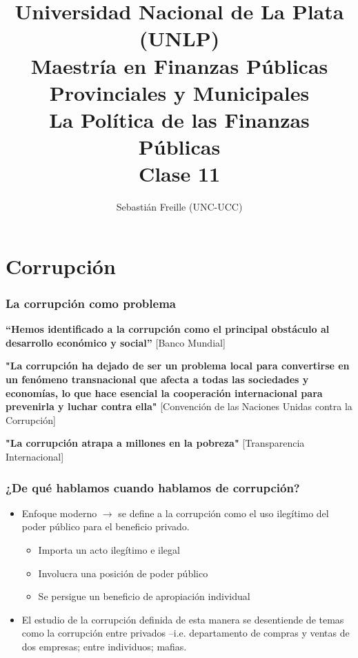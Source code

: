 \documentclass[handout,final,xcolor=dvipsnames]{beamer}
\author{Sebastián Freille (UNC-UCC)}
\title{Universidad Nacional de La Plata (UNLP) \\
  Maestría en Finanzas Públicas Provinciales y Municipales \\ La
  Política de las Finanzas Públicas \\ Clase 11}
\date{}
\institute{}
\begin{document}
\maketitle



\section{Corrupción}



\begin{frame}\frametitle{La corrupción como problema}
\begin{list}{}
\item \textbf{``Hemos identificado a la corrupción como el principal obstáculo al
desarrollo económico y social''} [Banco Mundial] \bigskip
\item \textbf{"La corrupción ha dejado de ser un problema local para convertirse en
un fenómeno transnacional que afecta a todas las sociedades y
economías, lo que hace esencial la cooperación internacional para
prevenirla y luchar contra ella"} [Convención de las Naciones Unidas
contra la Corrupción] \bigskip 
\item \textbf{"La corrupción atrapa a millones en la pobreza"} [Transparencia
  Internacional] \bigskip 
\end{list}
\end{frame}


\begin{frame}\frametitle{¿De qué hablamos cuando hablamos de corrupción?}
\begin{itemize}\itemsep 10pt
\item Enfoque moderno $\longrightarrow$ se define a la corrupción como
  el uso ilegítimo del poder público para el beneficio privado. 
\begin{itemize}
\item Importa un acto ilegítimo e ilegal 
\item Involucra una posición de poder público
\item Se persigue un beneficio de apropiación individual
\end{itemize}
\item El estudio de la corrupción definida de esta manera se
  desentiende de temas como la corrupción entre privados
  --i.e. departamento de compras y ventas de dos empresas; entre
  individuos; mafias.  
\end{itemize}
\end{frame}
\end{document}
